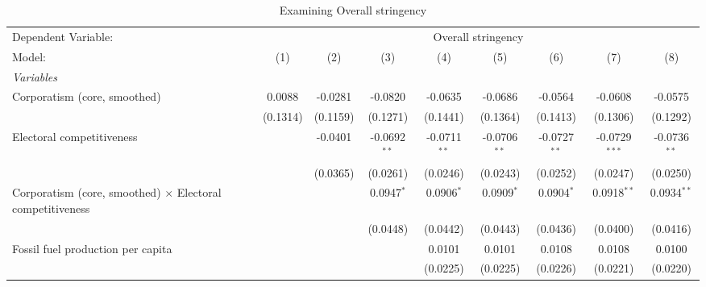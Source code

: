
\begin{table}[htbp]
   \caption{Examining Overall stringency}
   \centering
   \begin{tabular}{lcccccccc}
      \tabularnewline \midrule \midrule
      Dependent Variable: & \multicolumn{8}{c}{Overall stringency}\\
      Model:                                                           & (1)                   & (2)      & (3)            & (4)            & (5)            & (6)            & (7)             & (8)\\  
      \midrule
      \emph{Variables}\\
      Corporatism (core, smoothed)                                     & 0.0088                & -0.0281  & -0.0820        & -0.0635        & -0.0686        & -0.0564        & -0.0608         & -0.0575\\   
                                                                       & (0.1314)              & (0.1159) & (0.1271)       & (0.1441)       & (0.1364)       & (0.1413)       & (0.1306)        & (0.1292)\\   
      Electoral competitiveness                                        &                       & -0.0401  & -0.0692$^{**}$ & -0.0711$^{**}$ & -0.0706$^{**}$ & -0.0727$^{**}$ & -0.0729$^{***}$ & -0.0736$^{**}$\\   
                                                                       &                       & (0.0365) & (0.0261)       & (0.0246)       & (0.0243)       & (0.0252)       & (0.0247)        & (0.0250)\\   
      Corporatism (core, smoothed) $\times$ Electoral competitiveness  &                       &          & 0.0947$^{*}$   & 0.0906$^{*}$   & 0.0909$^{*}$   & 0.0904$^{*}$   & 0.0918$^{**}$   & 0.0934$^{**}$\\   
                                                                       &                       &          & (0.0448)       & (0.0442)       & (0.0443)       & (0.0436)       & (0.0400)        & (0.0416)\\   
      Fossil fuel production per capita                                &                       &          &                & 0.0101         & 0.0101         & 0.0108         & 0.0108          & 0.0100\\   
                                                                       &                       &          &                & (0.0225)       & (0.0225)       & (0.0226)       & (0.0221)        & (0.0220)\\   

\end{tabular}
\end{table}
